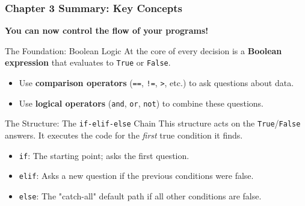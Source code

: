 \documentclass{beamer}
\begin{document}
\begin{frame}[fragile]
    \frametitle{Chapter 3 Summary: Key Concepts}
    
    \begin{center}
        \Large\textbf{You can now control the flow of your programs!}
    \end{center}
    \vspace{1em}
    
    \begin{block}{The Foundation: Boolean Logic}
        At the core of every decision is a \textbf{Boolean expression} that evaluates to \texttt{True} or \texttt{False}.
        \begin{itemize}
            \item Use \textbf{comparison operators} (\texttt{==}, \texttt{!=}, \texttt{>}, etc.) to ask questions about data.
            \item Use \textbf{logical operators} (\texttt{and}, \texttt{or}, \texttt{not}) to combine these questions.
        \end{itemize}
    \end{block}
    
    \begin{block}{The Structure: The \texttt{if-elif-else} Chain}
        This structure acts on the \texttt{True}/\texttt{False} answers. It executes the code for the \textit{first} true condition it finds.
        \begin{itemize}
            \item \texttt{if}: The starting point; asks the first question.
            \item \texttt{elif}: Asks a new question if the previous conditions were false.
            \item \texttt{else}: The "catch-all" default path if all other conditions are false.
        \end{itemize}
    \end{block}
\end{frame}
\end{document}
